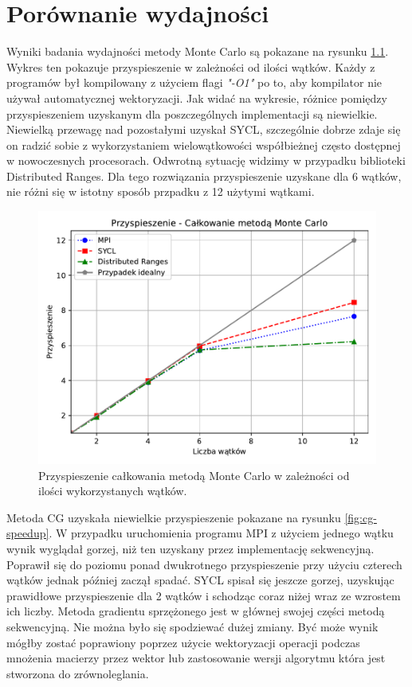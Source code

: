 \documentclass[a4paper,12pt]{book} %
\begin{document}
\chapter{Porównanie wydajności}
Wyniki badania wydajności metody Monte Carlo są pokazane na rysunku \ref{fig:monte-carlo-speedup}. Wykres ten pokazuje przyspieszenie w zależności od ilości wątków. Każdy z programów był kompilowany z użyciem flagi \emph{"-O1"} po to, aby kompilator nie używał automatycznej wektoryzacji. Jak widać na wykresie, różnice pomiędzy przyspieszeniem uzyskanym dla poszczególnych implementacji są niewielkie. Niewielką przewagę nad pozostałymi uzyskał SYCL, szczególnie dobrze zdaje się on radzić sobie z wykorzystaniem wielowątkowości współbieżnej często dostępnej w nowoczesnych procesorach. Odwrotną sytuację widzimy w przypadku biblioteki Distributed Ranges. Dla tego rozwiązania przyspieszenie uzyskane dla 6 wątków, nie różni się w istotny sposób przpadku z 12 użytymi wątkami.

\begin{figure}
	\centering
	\includegraphics[scale=1]{assets/przyspieszenie_calkowanie.pdf}
	\caption{Przyspieszenie całkowania metodą Monte Carlo w zależności od ilości wykorzystanych wątków.}
	\label{fig:monte-carlo-speedup}
\end{figure}

Metoda CG uzyskała niewielkie przyspieszenie pokazane na rysunku \ref{fig:cg-speedup}. W przypadku uruchomienia programu MPI z użyciem jednego wątku wynik wyglądał gorzej, niż ten uzyskany przez implementację sekwencyjną. Poprawił się do poziomu ponad dwukrotnego przyspieszenie przy użyciu czterech wątków jednak później zaczął spadać. SYCL spisał się jeszcze gorzej, uzyskując prawidłowe przyspieszenie dla 2 wątków i schodząc coraz niżej wraz ze wzrostem ich liczby. Metoda gradientu sprzężonego jest w głównej swojej części metodą sekwencyjną. Nie można było się spodziewać dużej zmiany. Być może wynik mógłby zostać poprawiony poprzez użycie wektoryzacji operacji podczas mnożenia macierzy przez wektor lub zastosowanie wersji algorytmu która jest stworzona do zrównoleglania.
\end{document}
